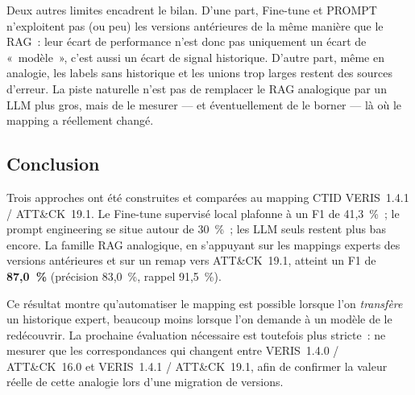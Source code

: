 \documentclass[a4paper,12pt]{article}
\begin{document}
Deux autres limites encadrent le bilan. D'une part, Fine-tune et
PROMPT n'exploitent pas (ou peu) les versions antérieures de la même
manière que le RAG~: leur écart de performance n'est donc pas
uniquement un écart de «~modèle~», c'est aussi un écart de signal
historique. D'autre part, même en analogie, les labels sans
historique et les unions trop larges restent des sources d'erreur.
La piste naturelle n'est pas de remplacer le RAG analogique par un
LLM plus gros, mais de le mesurer --- et éventuellement de le borner
--- là où le mapping a réellement changé.

\subsection{Conclusion}

Trois approches ont été construites et comparées au mapping CTID
VERIS~1.4.1 / ATT\&CK~19.1. Le Fine-tune supervisé local plafonne à
un F1 de 41,3~\%~; le prompt engineering se situe autour de 30~\%~;
les LLM seuls restent plus bas encore. La famille RAG analogique,
en s'appuyant sur les mappings experts des versions antérieures et
sur un remap vers ATT\&CK~19.1, atteint un F1 de \textbf{87,0~\%}
(précision 83,0~\%, rappel 91,5~\%).

Ce résultat montre qu'automatiser le mapping est possible lorsque
l'on \emph{transfère} un historique expert, beaucoup moins lorsque
l'on demande à un modèle de le redécouvrir. La prochaine évaluation
nécessaire est toutefois plus stricte~: ne mesurer que les
correspondances qui changent entre VERIS~1.4.0 / ATT\&CK~16.0 et
VERIS~1.4.1 / ATT\&CK~19.1, afin de confirmer la valeur réelle de
cette analogie lors d'une migration de versions.







\end{document}
